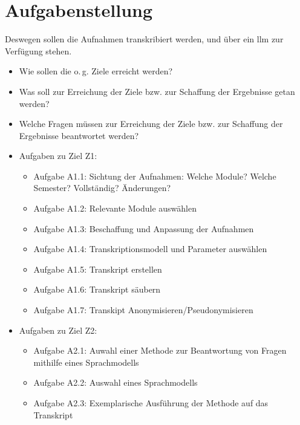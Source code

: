 \section{Aufgabenstellung}

Deswegen sollen die Aufnahmen transkribiert werden, und über ein \ac{llm} zur Verfügung stehen.

\begin{itemize}
\item Wie sollen die o.\,g. Ziele erreicht werden?
\item Was soll zur Erreichung der Ziele bzw. zur Schaffung der Ergebnisse getan werden?
\item Welche Fragen müssen zur Erreichung der Ziele bzw. zur Schaffung der Ergebnisse beantwortet  werden?
\end{itemize}

\begin{itemize}
\item Aufgaben zu Ziel Z1:
	\begin{itemize}
	\item Aufgabe A1.1: Sichtung der Aufnahmen: Welche Module? Welche Semester? Vollständig? Änderungen?
	\item Aufgabe A1.2: Relevante Module auswählen
	\item Aufgabe A1.3: Beschaffung und Anpassung der Aufnahmen
	\item Aufgabe A1.4: Transkriptionsmodell und Parameter auswählen
	\item Aufgabe A1.5: Transkript erstellen
	\item Aufgabe A1.6: Transkript säubern
	\item Aufgabe A1.7: Transkipt Anonymisieren/Pseudonymisieren
	\end{itemize}
\item Aufgaben zu Ziel Z2:
	\begin{itemize}
	\item Aufgabe A2.1: Auwahl einer Methode zur Beantwortung von Fragen mithilfe eines Sprachmodells 
	\item Aufgabe A2.2: Auswahl eines Sprachmodells
	\item Aufgabe A2.3: Exemplarische Ausführung der Methode auf das Transkript
	\end{itemize}
\end{itemize}
